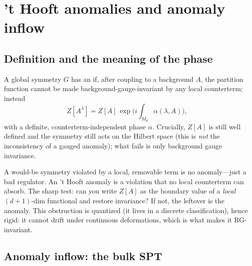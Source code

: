 \documentclass[11pt]{article}
\begin{document}
\section{'t Hooft anomalies and anomaly inflow}

\subsection{Definition and the meaning of the phase}

\begin{ddefinition}
A global symmetry $G$ has an  if, after coupling to a background
$A$, the partition function cannot be made background-gauge-invariant by any local
counterterm; instead
\[
Z[A^\lambda] = Z[A]\,\exp\!\Big(i\!\int_{M_d}\!\alpha(\lambda,A)\Big),
\]
with a definite, counterterm-independent phase $\alpha$. Crucially, $Z[A]$ is still
well defined and the symmetry still acts on the Hilbert space (this is \emph{not} the
inconsistency of a gauged anomaly); what fails is only background gauge invariance.
\end{ddefinition}

\begin{iintuition}[Anomaly = an obstruction you cannot localize away]
A would-be symmetry violated by a local, removable term is no anomaly---just a bad
regulator. An 't Hooft anomaly is a violation that no local counterterm can absorb. The
sharp test: can you write $Z[A]$ as the boundary value of a \emph{local} $(d{+}1)$-dim
functional and restore invariance? If not, the leftover is the anomaly. This obstruction
is quantized (it lives in a discrete classification), hence rigid: it cannot drift under
continuous deformations, which is what makes it RG-invariant.
\end{iintuition}

\subsection{Anomaly inflow: the bulk SPT}
\end{document}
